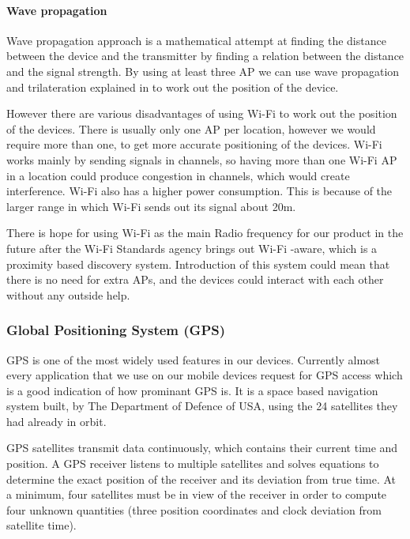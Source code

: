 \paragraph{Wave propagation}
Wave propagation approach is a mathematical attempt at finding the
distance between the device and the transmitter by finding a relation
between the distance and the signal strength. By using at least three
AP we can use wave propagation and trilateration explained in  to work out the position
of the device. 

However there are various disadvantages of using Wi-Fi to work out
the position of the devices. There is usually only one AP per location,
however we would require more than one, to get more accurate positioning
of the devices. Wi-Fi works mainly by sending signals in channels,
so having more than one Wi-Fi AP in a location could produce congestion
in channels, which would create interference. Wi-Fi also has a higher
power consumption. This is because of the larger range in which Wi-Fi
sends out its signal about 20m\cite{wifi-wikipedia}. 

There is hope for using Wi-Fi as the main Radio frequency for our
product in the future after the Wi-Fi Standards agency brings out
Wi-Fi -aware, which is a proximity based discovery system. Introduction
of this system could mean that there is no need for extra  APs, and the devices could interact with each other without any
outside help. 


\subsubsection{Global Positioning System (GPS)}

GPS is one of the most widely used features in our devices. Currently almost every application that
we use on our mobile devices request for GPS access which is a good indication of
how prominant GPS is. It is a space based navigation system built, by The Department of Defence of USA, using the 24 satellites they had already in orbit\cite{gps_basics}. 

GPS satellites transmit data continuously, which contains their current
time and position. A GPS receiver listens to multiple satellites and
solves equations to determine the exact position of the receiver and
its deviation from true time. At a minimum, four satellites must be
in view of the receiver in order to compute four unknown quantities
(three position coordinates and clock deviation from satellite time). 

